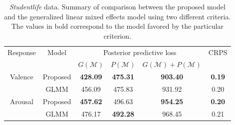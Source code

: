 

\begin{table}[t!] \centering
\small
\caption{\textit{Studentlife} data. Summary of comparison between the proposed model 
and the generalized linear mixed effects model using two different criteria. The values 
in bold correspond to the model favored by the particular criterion.} 
\label{tab:comprealapp}
\begin{tabular}{cccccc}
\hline
\hline
\multirow{2}{*}{Response} & \multirow{2}{*}{Model} & \multicolumn{3}{c}{Posterior predictive loss} & \multirow{2}{*}{CRPS} \\
\cline{3-5} & & $G(\mathcal{M})$ & $P(\mathcal{M})$ & $G(\mathcal{M})+P(\mathcal{M})$ & \\
\hline
\hline
\multirow{2}{*}{Valence} & Proposed & \textbf{428.09} & \textbf{475.31} & \textbf{903.40} & \textbf{0.19}\\
& GLMM & 456.09 & 475.83 & 931.92 & 0.20 \\
\hline
\multirow{2}{*}{Arousal} & Proposed & \textbf{457.62} & 496.63 & \textbf{954.25} & \textbf{0.20}\\
& GLMM & 476.17 & \textbf{492.28} & 968.45 & 0.21 \\
\hline
\hline
\end{tabular}
\end{table}


